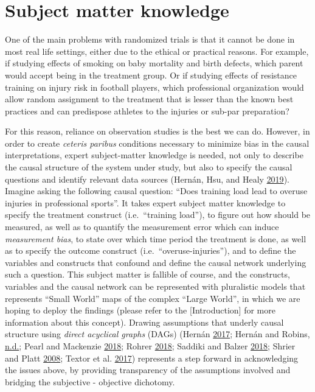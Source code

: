 \documentclass[
]{book}
\begin{document}
\hypertarget{subject-matter-knowledge}{%
\section{Subject matter knowledge}\label{subject-matter-knowledge}}

One of the main problems with randomized trials is that it cannot be done in most real life settings, either due to the ethical or practical reasons. For example, if studying effects of smoking on baby mortality and birth defects, which parent would accept being in the treatment group. Or if studying effects of resistance training on injury risk in football players, which professional organization would allow random assignment to the treatment that is lesser than the known best practices and can predispose athletes to the injuries or sub-par preparation?

For this reason, reliance on observation studies is the best we can do. However, in order to create \emph{ceteris paribus} conditions necessary to minimize bias in the causal interpretations, expert subject-matter knowledge is needed, not only to describe the causal structure of the system under study, but also to specify the causal questions and identify relevant data sources (Hernán, Hsu, and Healy \protect\hyperlink{ref-hernanSecondChanceGet2019}{2019}). Imagine asking the following causal question: ``Does training load lead to overuse injuries in professional sports''. It takes expert subject matter knowledge to specify the treatment construct (i.e.~``training load''), to figure out how should be measured, as well as to quantify the measurement error which can induce \emph{measurement bias}, to state over which time period the treatment is done, as well as to specify the outcome construct (i.e.~``overuse-injuries''), and to define the variables and constructs that confound and define the causal network underlying such a question. This subject matter is fallible of course, and the constructs, variables and the causal network can be represented with pluralistic models that represents ``Small World'' maps of the complex ``Large World'', in which we are hoping to deploy the findings (please refer to the {[}Introduction{]} for more information about this concept). Drawing assumptions that underly causal structure using \emph{direct acyclical graphs} (DAGs) (Hernán \protect\hyperlink{ref-hernanCausalDiagramsDraw2017}{2017}; Hernán and Robins, \protect\hyperlink{ref-hernanCausalInference2019}{n.d.}; Pearl and Mackenzie \protect\hyperlink{ref-pearlBookWhyNew2018}{2018}; Rohrer \protect\hyperlink{ref-rohrerThinkingClearlyCorrelations2018}{2018}; Saddiki and Balzer \protect\hyperlink{ref-saddikiPrimerCausalityData2018}{2018}; Shrier and Platt \protect\hyperlink{ref-shrierReducingBiasDirected2008}{2008}; Textor et al. \protect\hyperlink{ref-textorRobustCausalInference2017}{2017}) represents a step forward in acknowledging the issues above, by providing transparency of the assumptions involved and bridging the subjective - objective dichotomy.
\end{document}

